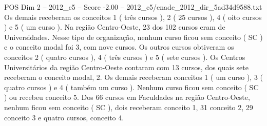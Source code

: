 \begin{textsample}{POS Dim 2 – 2012\_c5 – Score -2.00 – 2012\_c5/enade\_2012\_dir\_5ad34d9588.txt}
Os demais receberam os conceitos 1 ( três cursos ), 2 ( 25 cursos ), 4 ( oito cursos ) e 5 ( um curso ).
Na região Centro-Oeste, 23 dos 102 cursos eram de Universidades.
Nesse tipo de organização, nenhum curso ficou sem conceito ( SC ) e o conceito modal foi 3, com nove cursos.
Os outros cursos obtiveram os conceitos 2 ( quatro cursos ), 4 ( três cursos ) e 5 ( sete cursos ).
Os Centros Universitários da região Centro-Oeste contaram com 13 cursos, dos quais sete receberam o conceito modal, 2.
Os demais receberam conceitos 1 ( um curso ), 3 ( quatro cursos ) e 4 ( também um curso ).
Nenhum curso ficou sem conceito ( SC ) ou recebeu conceito 5.
Dos 66 cursos em Faculdades na região Centro-Oeste, nenhum ficou sem conceito ( SC ), dois receberam conceito 1, 31 conceito 2, 29 conceito 3 e quatro cursos, conceito 4.

\end{textsample}
